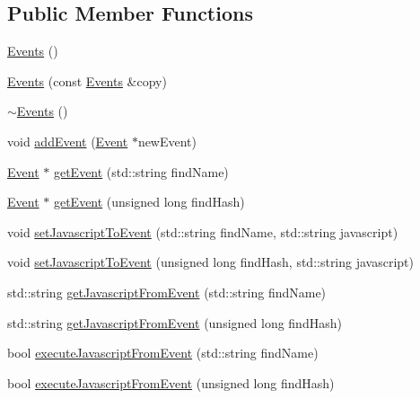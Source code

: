 \subsection*{Public Member Functions}
\begin{DoxyCompactItemize}
\item 
\hyperlink{class_rad_xml_1_1_events_ae460bf44fae3b62c10bf7cf2ced14198}{Events} ()
\item 
\hyperlink{class_rad_xml_1_1_events_ab54f134ced007f4011c0ef814f6b3c09}{Events} (const \hyperlink{class_rad_xml_1_1_events}{Events} \&copy)
\item 
\hyperlink{class_rad_xml_1_1_events_abb2a74b17b9b6749f689d993b9a48e6a}{$\sim$\-Events} ()
\item 
void \hyperlink{class_rad_xml_1_1_events_a067da793ea72e4b5f7d727413386fc3c}{add\-Event} (\hyperlink{class_rad_xml_1_1_event}{Event} $\ast$new\-Event)
\item 
\hyperlink{class_rad_xml_1_1_event}{Event} $\ast$ \hyperlink{class_rad_xml_1_1_events_ac79e7a61e09957f3b4d5809fd2b28249}{get\-Event} (std\-::string find\-Name)
\item 
\hyperlink{class_rad_xml_1_1_event}{Event} $\ast$ \hyperlink{class_rad_xml_1_1_events_a6c980acacaef56e596464f95d0ec43df}{get\-Event} (unsigned long find\-Hash)
\item 
void \hyperlink{class_rad_xml_1_1_events_ae913a8370773efb008f9d190ba462bc8}{set\-Javascript\-To\-Event} (std\-::string find\-Name, std\-::string javascript)
\item 
void \hyperlink{class_rad_xml_1_1_events_a9f39e017d8eb11ccfb5af0c6aee594a0}{set\-Javascript\-To\-Event} (unsigned long find\-Hash, std\-::string javascript)
\item 
std\-::string \hyperlink{class_rad_xml_1_1_events_ae44514642ee46f7c51385775c8ed394a}{get\-Javascript\-From\-Event} (std\-::string find\-Name)
\item 
std\-::string \hyperlink{class_rad_xml_1_1_events_a2837d1b8210a14646a410ce02d6011b5}{get\-Javascript\-From\-Event} (unsigned long find\-Hash)
\item 
bool \hyperlink{class_rad_xml_1_1_events_a6a68e1791f8be2960b91bf81e80ce600}{execute\-Javascript\-From\-Event} (std\-::string find\-Name)
\item 
bool \hyperlink{class_rad_xml_1_1_events_a1cadc39db1a69f9ec72279458561dbf8}{execute\-Javascript\-From\-Event} (unsigned long find\-Hash)
\end{DoxyCompactItemize}


